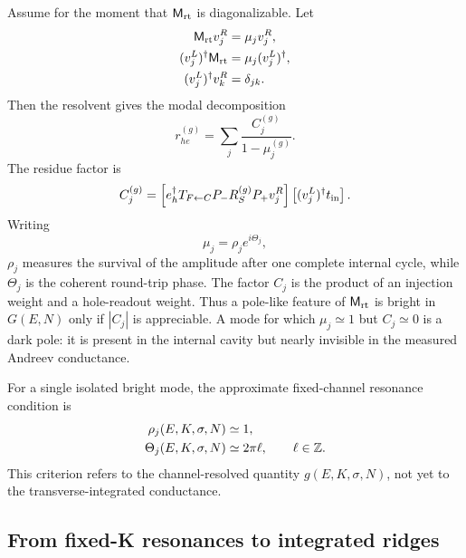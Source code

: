 Assume for the moment that $\mathsf M_{\mathrm{rt}}$ is diagonalizable.  Let
\begin{align}
    \mathsf M_{\mathrm{rt}} v_j^R
    &=\mu_j v_j^R,
    \notag\\
    (v_j^L)^\dagger\mathsf M_{\mathrm{rt}}
    &=\mu_j(v_j^L)^\dagger,
    \notag\\
    (v_j^L)^\dagger v_k^R
    &=\delta_{jk}.
    \label{eq:Mrt-biorthogonal}
\end{align}
Then the resolvent gives the modal decomposition
\begin{equation}
    r_{he}^{(g)}
    =
    \sum_j
    \frac{C_j^{(g)}}{1-\mu_j^{(g)}}.
    \label{eq:rhe-modal-sum}
\end{equation}
The residue factor is
\begin{equation}
    C_j^{(g)}
    =
    \left[
        e_h^\dagger
        T_{F\leftarrow C}
        P_-
        R_S^{(g)}
        P_+
        v_j^R
    \right]
    \left[
        (v_j^L)^\dagger t_{\rm in}
    \right].
    \label{eq:Cj-residue}
\end{equation}
Writing
\begin{equation}
    \mu_j=\rho_j e^{i\Theta_j},
    \label{eq:mu-polar}
\end{equation}
$\rho_j$ measures the survival of the amplitude after one complete internal cycle, while $\Theta_j$ is the coherent round-trip phase.  The factor $C_j$ is the product of an injection weight and a hole-readout weight.  Thus a pole-like feature of $\mathsf M_{\mathrm{rt}}$ is bright in $G(E,N)$ only if $|C_j|$ is appreciable.  A mode for which $\mu_j\simeq1$ but $C_j\simeq0$ is a dark pole: it is present in the internal cavity but nearly invisible in the measured Andreev conductance.

For a single isolated bright mode, the approximate fixed-channel resonance condition is
\begin{align}
    \rho_j(E,K,\sigma,N)&\simeq1,
    \notag\\
    \Theta_j(E,K,\sigma,N)&\simeq2\pi\ell,
    \qquad
    \ell\in\mathbb Z.
    \label{eq:phase-condition}
\end{align}
This criterion refers to the channel-resolved quantity $g(E,K,\sigma,N)$, not yet to the transverse-integrated conductance.

\subsection{From fixed-K resonances to integrated ridges}
\label{subsec:fixed-K-to-integrated}

